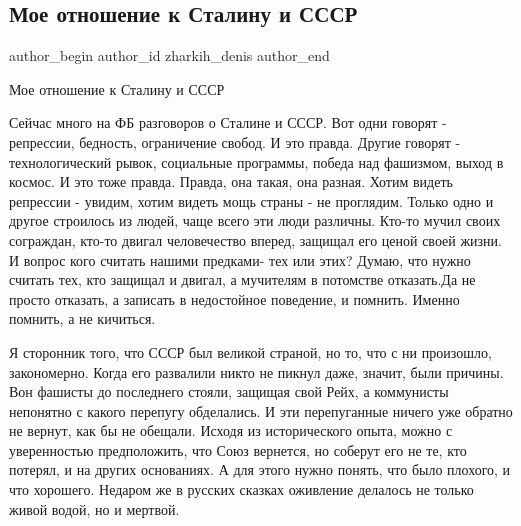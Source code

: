  
 
 
 
 
 
\subsection{Мое отношение к Сталину и СССР}
\label{sec:27_12_2015.fb.zharkih_denis.1.sssr_stalin}
 
\ifcmt
 author_begin
   author_id zharkih_denis
 author_end
\fi

Мое отношение к Сталину и СССР

Сейчас много на ФБ разговоров о Сталине и СССР. Вот одни говорят - репрессии,
бедность, ограничение свобод. И это правда. Другие говорят - технологический
рывок, социальные программы, победа над фашизмом, выход в космос. И это тоже
правда. Правда, она такая, она разная. Хотим видеть репрессии - увидим, хотим
видеть мощь страны - не проглядим. Только одно и другое строилось из людей,
чаще всего эти люди различны. Кто-то мучил своих сограждан, кто-то двигал
человечество вперед, защищал его ценой своей жизни. И вопрос кого считать
нашими предками- тех или этих? Думаю, что нужно считать тех, кто защищал и
двигал, а мучителям в потомстве отказать.Да не просто отказать, а записать в
недостойное поведение, и помнить. Именно помнить, а не кичиться. 

Я сторонник того, что СССР был великой страной, но то, что с ни произошло,
закономерно. Когда его развалили никто не пикнул даже, значит, были причины.
Вон фашисты до последнего стояли, защищая свой Рейх, а коммунисты непонятно с
какого перепугу обделались. И эти перепуганные ничего уже обратно не вернут,
как бы не обещали. Исходя из исторического опыта, можно с уверенностью
предположить, что Союз вернется, но соберут его не те, кто потерял, и на других
основаниях. А для этого нужно понять, что было плохого, и что хорошего. Недаром
же в русских сказках оживление делалось не только живой водой, но и мертвой.

